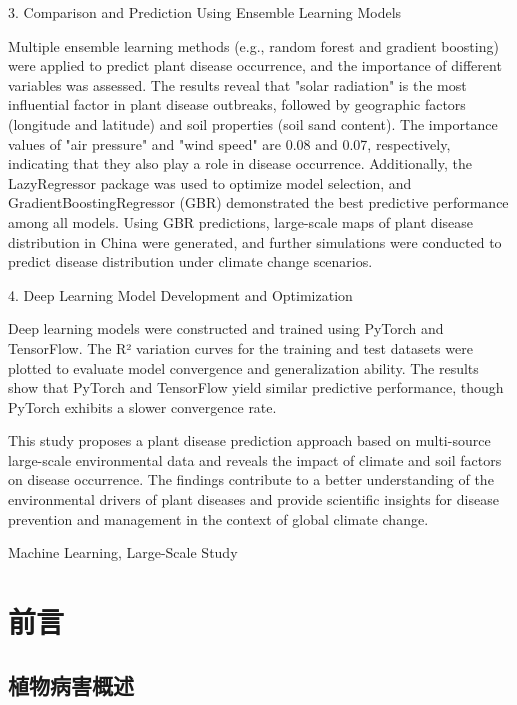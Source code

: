 \documentclass[AutoFakeBold]{LZUThesis-PgD&PhD}
\begin{document}
{		\par 3. Comparison and Prediction Using Ensemble Learning Models
		\par Multiple ensemble learning methods (e.g., random forest and gradient boosting) were applied to predict plant disease occurrence, and the importance of different variables was assessed. The results reveal that "solar radiation" is the most influential factor in plant disease outbreaks, followed by geographic factors (longitude and latitude) and soil properties (soil sand content). The importance values of "air pressure" and "wind speed" are 0.08 and 0.07, respectively, indicating that they also play a role in disease occurrence. Additionally, the LazyRegressor package was used to optimize model selection, and GradientBoostingRegressor (GBR) demonstrated the best predictive performance among all models. Using GBR predictions, large-scale maps of plant disease distribution in China were generated, and further simulations were conducted to predict disease distribution under climate change scenarios.
		
		\par 4. Deep Learning Model Development and Optimization
		\par Deep learning models were constructed and trained using PyTorch and TensorFlow. The R² variation curves for the training and test datasets were plotted to evaluate model convergence and generalization ability. The results show that PyTorch and TensorFlow yield similar predictive performance, though PyTorch exhibits a slower convergence rate.
		
		\par This study proposes a plant disease prediction approach based on multi-source large-scale environmental data and reveals the impact of climate and soil factors on disease occurrence. The findings contribute to a better understanding of the environmental drivers of plant diseases and provide scientific insights for disease prevention and management in the context of global climate change.
		}{Machine Learning, Large-Scale Study}
	
	
	\mainmatter
	
	
	
	\chapter{前言}
	
	\section{植物病害概述}
	
\end{document}
